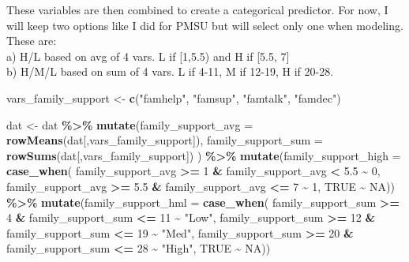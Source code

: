 \documentclass[
]{article}
\newenvironment{Shaded}{\begin{snugshade}}{\end{snugshade}}
\newcommand{\AttributeTok}[1]{\textcolor[rgb]{0.13,0.29,0.53}{#1}}
\newcommand{\ConstantTok}[1]{\textcolor[rgb]{0.56,0.35,0.01}{#1}}
\newcommand{\DecValTok}[1]{\textcolor[rgb]{0.00,0.00,0.81}{#1}}
\newcommand{\FloatTok}[1]{\textcolor[rgb]{0.00,0.00,0.81}{#1}}
\newcommand{\FunctionTok}[1]{\textcolor[rgb]{0.13,0.29,0.53}{\textbf{#1}}}
\newcommand{\NormalTok}[1]{#1}
\newcommand{\OtherTok}[1]{\textcolor[rgb]{0.56,0.35,0.01}{#1}}
\newcommand{\SpecialCharTok}[1]{\textcolor[rgb]{0.81,0.36,0.00}{\textbf{#1}}}
\newcommand{\StringTok}[1]{\textcolor[rgb]{0.31,0.60,0.02}{#1}}
\begin{document}
These variables are then combined to create a categorical predictor. For
now, I will keep two options like I did for PMSU but will select only
one when modeling. These are:\\
a) H/L based on avg of 4 vars. L if {[}1,5.5) and H if {[}5.5, 7{]}\\
b) H/M/L based on sum of 4 vars. L if 4-11, M if 12-19, H if 20-28.

\begin{Shaded}
\begin{Highlighting}[]
\NormalTok{vars\_family\_support }\OtherTok{\textless{}{-}} \FunctionTok{c}\NormalTok{(}\StringTok{"famhelp"}\NormalTok{, }\StringTok{"famsup"}\NormalTok{, }\StringTok{"famtalk"}\NormalTok{, }\StringTok{"famdec"}\NormalTok{)}

\NormalTok{dat }\OtherTok{\textless{}{-}}\NormalTok{ dat }\SpecialCharTok{\%\textgreater{}\%}
   \FunctionTok{mutate}\NormalTok{(}\AttributeTok{family\_support\_avg =} \FunctionTok{rowMeans}\NormalTok{(dat[,vars\_family\_support]),}
          \AttributeTok{family\_support\_sum =} \FunctionTok{rowSums}\NormalTok{(dat[,vars\_family\_support])}
\NormalTok{          ) }\SpecialCharTok{\%\textgreater{}\%}
   \FunctionTok{mutate}\NormalTok{(}\AttributeTok{family\_support\_high =} \FunctionTok{case\_when}\NormalTok{(}
\NormalTok{            family\_support\_avg }\SpecialCharTok{\textgreater{}=} \DecValTok{1} \SpecialCharTok{\&}\NormalTok{ family\_support\_avg }\SpecialCharTok{\textless{}} \FloatTok{5.5} \SpecialCharTok{\textasciitilde{}} \DecValTok{0}\NormalTok{,}
\NormalTok{            family\_support\_avg }\SpecialCharTok{\textgreater{}=} \FloatTok{5.5} \SpecialCharTok{\&}\NormalTok{ family\_support\_avg }\SpecialCharTok{\textless{}=} \DecValTok{7} \SpecialCharTok{\textasciitilde{}} \DecValTok{1}\NormalTok{,}
            \ConstantTok{TRUE} \SpecialCharTok{\textasciitilde{}} \ConstantTok{NA}\NormalTok{)) }\SpecialCharTok{\%\textgreater{}\%}
   \FunctionTok{mutate}\NormalTok{(}\AttributeTok{family\_support\_hml =} \FunctionTok{case\_when}\NormalTok{(}
\NormalTok{            family\_support\_sum }\SpecialCharTok{\textgreater{}=} \DecValTok{4} \SpecialCharTok{\&}\NormalTok{ family\_support\_sum }\SpecialCharTok{\textless{}=} \DecValTok{11} \SpecialCharTok{\textasciitilde{}} \StringTok{"Low"}\NormalTok{,}
\NormalTok{            family\_support\_sum }\SpecialCharTok{\textgreater{}=} \DecValTok{12} \SpecialCharTok{\&}\NormalTok{ family\_support\_sum }\SpecialCharTok{\textless{}=} \DecValTok{19} \SpecialCharTok{\textasciitilde{}} \StringTok{"Med"}\NormalTok{,}
\NormalTok{            family\_support\_sum }\SpecialCharTok{\textgreater{}=} \DecValTok{20} \SpecialCharTok{\&}\NormalTok{ family\_support\_sum }\SpecialCharTok{\textless{}=} \DecValTok{28} \SpecialCharTok{\textasciitilde{}} \StringTok{"High"}\NormalTok{,}
            \ConstantTok{TRUE} \SpecialCharTok{\textasciitilde{}} \ConstantTok{NA}\NormalTok{))}
\end{Highlighting}
\end{Shaded}
\end{document}
